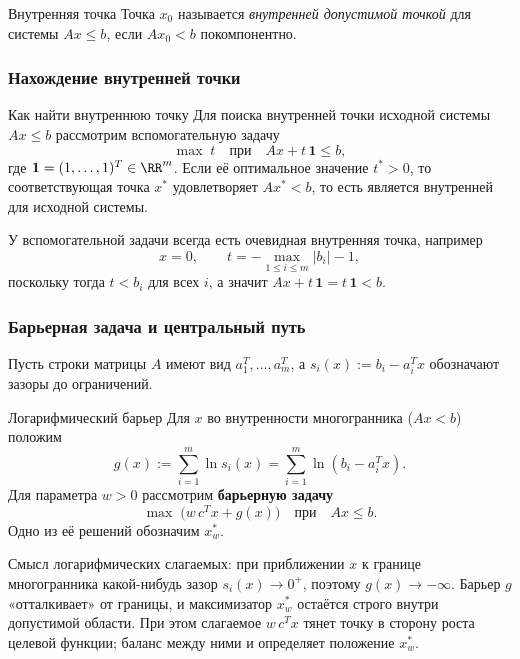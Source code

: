 \begin{Definition}{Внутренняя точка}{}
	Точка $x_0$ называется \emph{внутренней допустимой точкой} для системы $Ax \le b$, если $Ax_0 < b$ покомпонентно.
\end{Definition}

\subsubsection*{Нахождение внутренней точки}

\begin{Remark}{Как найти внутреннюю точку}{}
	Для поиска внутренней точки исходной системы $Ax \le b$ рассмотрим вспомогательную задачу
	\[
	\max \; t
	\quad \text{при} \quad
	Ax + t\,\mathbf{1} \le b,
	\]
	где $\mathbf{1} = (1,\dots,1)^T \in \RR^m$. Если её оптимальное значение $t^* > 0$, то соответствующая точка $x^*$ удовлетворяет $Ax^* < b$, то есть является внутренней для исходной системы.
	
	У вспомогательной задачи всегда есть очевидная внутренняя точка, например
	\[
	x = 0,\qquad t = -\max_{1 \le i \le m} |b_i| - 1,
	\]
	поскольку тогда $t < b_i$ для всех $i$, а значит $Ax + t\,\mathbf{1} = t\,\mathbf{1} < b$.
\end{Remark}

\subsubsection*{Барьерная задача и центральный путь}

Пусть строки матрицы $A$ имеют вид $a_1^T,\dots,a_m^T$, а $s_i(x) := b_i - a_i^T x$ обозначают зазоры до ограничений.

\begin{Definition}{Логарифмический барьер}{}
	Для $x$ во внутренности многогранника ($Ax < b$) положим
	\[
	g(x) := \sum_{i=1}^m \ln s_i(x) = \sum_{i=1}^m \ln(b_i - a_i^T x).
	\]
	Для параметра $w > 0$ рассмотрим \textbf{барьерную задачу}
	\[
	\max\; \bigl(w\, c^T x + g(x)\bigr)
	\quad \text{при} \quad
	Ax \le b.
	\]
	Одно из её решений обозначим $x_w^*$.
\end{Definition}

Смысл логарифмических слагаемых: при приближении $x$ к границе многогранника какой-нибудь зазор $s_i(x) \to 0^+$, поэтому $g(x) \to -\infty$. Барьер $g$ «отталкивает» от границы, и максимизатор $x_w^*$ остаётся строго внутри допустимой области. При этом слагаемое $w\,c^T x$ тянет точку в сторону роста целевой функции; баланс между ними и определяет положение $x_w^*$.

